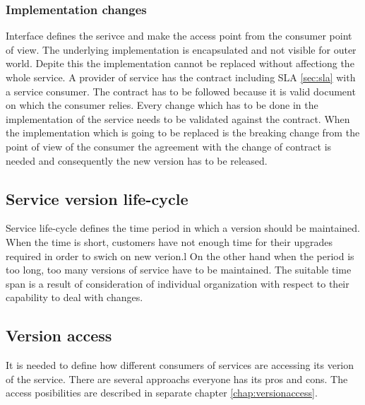 \subsubsection{Implementation changes}
Interface defines the serivce and make the access point from the consumer point of view. The underlying implementation is encapsulated and not visible for outer world. Depite this the implementation cannot be replaced without affectiong the whole service. A provider of service has the contract including SLA \ref{sec:sla} with a service consumer. The contract has to be followed because it is valid document on which the consumer relies. 
Every change which has to be done in the implementation of the service needs to be validated against the contract. When the implementation which is going to be replaced is the breaking change from the point of view of the consumer the agreement with the change of contract is needed and consequently the new version has to be released.

\subsection{Service version life-cycle}
Service life-cycle defines the time period in which a version should be maintained. When the time is short, customers have not enough time for their upgrades required in order to swich on new verion.l On the other hand when the period is too long, too many versions of service have to be maintained. The suitable time span is a result of consideration of individual organization with respect to their capability to deal with changes.

\subsection{Version access}
It is needed to define how different consumers of services are accessing its verion of the service. There are several approachs everyone has its pros and cons. The access posibilities are described in separate chapter \ref{chap:versionaccess}.
